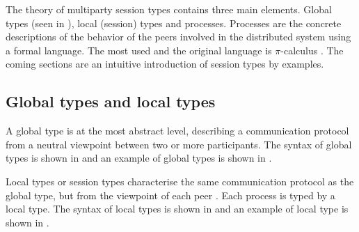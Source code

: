The theory of multiparty session types contains three main elements. Global types (seen in ), local (session) types and processes. Processes are the concrete descriptions of the behavior of the peers involved in the distributed system \cite{coppoGentleIntroductionMultiparty2015} using a formal language. The most used and the original language is $\pi$-calculus \cite{milnerCalculusMobileProcesses1992}. The coming sections are an intuitive introduction of session types by examples.
\subsection{Global types and local types} \label{b:mpst:st}
A global type is at the most abstract level, describing a communication protocol from a neutral viewpoint between two or more participants\cite{coppoGentleIntroductionMultiparty2015}. The syntax of global types is shown in  and an example of global types is shown in .

Local types or session types characterise the same communication protocol as the global type, but from the viewpoint of each peer \cite{coppoGentleIntroductionMultiparty2015}. Each process is typed by a local type. The syntax of local types is shown in  and an example of local type is shown in . 

